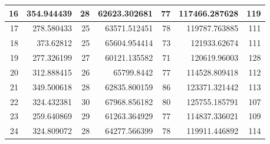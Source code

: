 \begin{table}
\begin{adjustwidth}{}{}
{{\begin{tabular}{|r|r|r|r|r|r|r|}
\hline
16                                         & 354.944439                   & 28                                    & 62623.302681                   & 77                                    & 117466.287628                & 119                                    \\ 
\hline
17                                         & 278.580433                   & 25                                    & 63571.512451                   & 78                                    & 119787.763885                & 111                                    \\ 
\hline
18                                         & 373.62812                    & 25                                    & 65604.954414                   & 73                                    & 121933.62674                 & 111                                    \\ 
\hline
19                                         & 277.326199                   & 27                                    & 60121.135582                   & 71                                    & 120619.96003                 & 128                                    \\ 
\hline
20                                         & 312.888415                   & 26                                    & 65799.8442                     & 77                                    & 114528.809418                & 112                                    \\ 
\hline
21                                         & 349.500618                   & 28                                    & 62835.800159                   & 86                                    & 123371.321442                & 113                                    \\ 
\hline
22                                         & 324.432381                   & 30                                    & 67968.856182                   & 80                                    & 125755.185791                & 107                                    \\ 
\hline
23                                         & 259.640869                   & 29                                    & 61263.364929                   & 77                                    & 114837.336021                & 109                                    \\ 
\hline
24                                         & 324.809072                   & 28                                    & 64277.566399                   & 78                                    & 119911.446892                & 114                                    \\ 

\end{tabular}}}
\end{adjustwidth}
\end{table}
